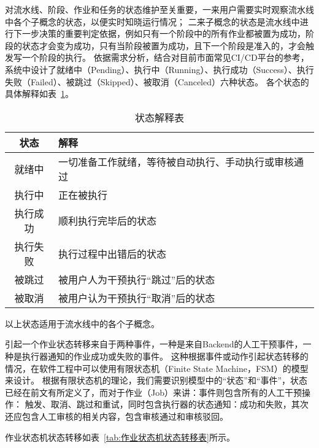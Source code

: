 对流水线、阶段、作业和任务的状态维护至关重要，一来用户需要实时观察流水线中各个子概念的状态，以便实时知晓运行情况；
二来子概念的状态是流水线中进行下一步决策的重要判定依据，例如只有一个阶段中的所有作业都被置为成功，阶段的状态才会变为成功，只有当阶段被置为成功，且下一个阶段是准入的，才会触发写一个阶段的执行。
依据需求分析，结合对目前市面常见CI/CD平台的参考，系统中设计了就绪中（Pending）、执行中（Running）、执行成功（Success）、执行失败（Failed）、被跳过（Skipped）、被取消（Canceled）六种状态。
各个状态的具体解释如表~\ref{tab:状态解释表}。
\begin{table}[h]
  \centering
  \caption{状态解释表}
  \label{tab:状态解释表}
  \begin{tabular}{cl}
    \toprule
    状态           & 解释                                     \\
    \midrule
    就绪中         & 一切准备工作就绪，等待被自动执行、手动执行或审核通过\\
    执行中         & 正在被执行                 \\
    执行成功       & 顺利执行完毕后的状态        \\
    执行失败       & 执行过程中出错后的状态       \\
    被跳过         & 被用户人为干预执行“跳过”后的状态         \\
    被取消         & 被用户认为干预执行“取消”后的状态         \\
    \bottomrule
  \end{tabular}
\end{table}
以上状态适用于流水线中的各个子概念。

引起一个作业状态转移来自于两种事件，一种是来自Backend的人工干预事件，一种是执行器通知的作业成功或失败的事件。
这种根据事件或动作引起状态转移的情况，在软件工程中可以使用有限状态机（Finite State Machine，FSM）的模型来设计。
根据有限状态机的理论，我们需要识别模型中的“状态”和“事件”，状态已经在前文有所定义了，而对于作业（Job）来讲：事件则包含所有的人工干预操作：
触发、取消、跳过和重试，同时包含执行器的状态通知：成功和失败，其次还应包含人工审核的相关内容，包含审核通过和审核驳回。

作业状态机状态转移如表~\ref{tab:作业状态机状态转移表}所示。

